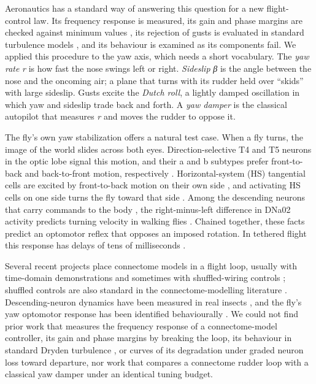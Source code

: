 \documentclass[11pt,letterpaper]{article}
\begin{document}
Aeronautics has a standard way of answering this question for a new
flight-control law. Its frequency response is measured, its gain and
phase margins are checked against minimum values \cite{milf94901975},
its rejection of gusts is evaluated in standard turbulence models
\cite{milf87851980}, and its behaviour is examined as its components
fail. We applied this procedure to the yaw axis, which needs a short
vocabulary. The \emph{yaw rate} \emph{r} is how fast the nose swings
left or right. \emph{Sideslip} \emph{β} is the angle between the nose
and the oncoming air; a plane that turns with its rudder held over
``skids'' with large sideslip. Gusts excite the \emph{Dutch roll}, a
lightly damped oscillation in which yaw and sideslip trade back and
forth. A \emph{yaw damper} is the classical autopilot that measures
\emph{r} and moves the rudder to oppose it.

The fly's own yaw stabilization offers a natural test case. When a fly
turns, the image of the world slides across both eyes.
Direction-selective T4 and T5 neurons in the optic lobe signal this
motion, and their a and b subtypes prefer front-to-back and
back-to-front motion, respectively \cite{maisak2013,shinomiya2019}.
Horizontal-system (HS) tangential cells are excited by front-to-back
motion on their own side \cite{schnell2010}, and activating HS cells on
one side turns the fly toward that side \cite{haikala2013}. Among the
descending neurons that carry commands to the body \cite{namiki2018},
the right-minus-left difference in DNa02 activity predicts turning
velocity in walking flies \cite{rayshubskiy2025}. Chained together,
these facts predict an optomotor reflex that opposes an imposed
rotation. In tethered flight this response has delays of tens of
milliseconds \cite{theobald2010}.

Several recent projects place connectome models in a flight loop,
usually with time-domain demonstrations and sometimes with
shuffled-wiring controls \cite{clutch2026,leohio2026,flygm2026};
shuffled controls are also standard in the connectome-modelling
literature \cite{shiu2024}. Descending-neuron dynamics have been
measured in real insects \cite{leibbrandt2021}, and the fly's yaw
optomotor response has been identified behaviourally
\cite{theobald2010}. We could not find prior work that measures the
frequency response of a connectome-model controller, its gain and phase
margins by breaking the loop, its behaviour in standard Dryden
turbulence \cite{milf87851980}, or curves of its degradation under
graded neuron loss toward departure, nor work that compares a connectome
rudder loop with a classical yaw damper under an identical tuning
budget.
\end{document}

